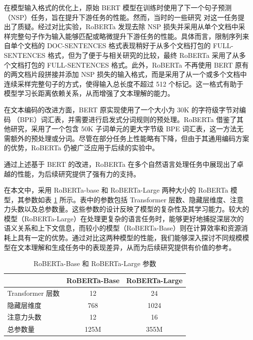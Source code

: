 在模型输入格式的优化上，原始 BERT 模型在训练时使用了下一个句子预测（NSP）任务，旨在提升下游任务的性能。然而，当时的一些研究 \cite{Lample2019CrosslingualLM, Yang2019XLNetGA, Joshi2019SpanBERTIP} 对这一任务提出了质疑。经过对比实验，RoBERTa 发现去除 NSP 损失并采用从单个文档中采样完整句子作为输入能够匹配或略微提升下游任务的性能。具体而言，限制序列来自单个文档的 DOC-SENTENCES 格式表现稍好于从多个文档打包的 FULL-SENTENCES 格式，但为了便于与相关研究的比较，最终 RoBERTa 采用了从多个文档打包的 FULL-SENTENCES 格式。此外，RoBERTa 不再使用 BERT 原有的两文档片段拼接并添加 NSP 损失的输入格式，而是采用了从一个或多个文档中连续采样完整句子的方式，使得输入总长度不超过 512 个标记。这一格式有助于模型学习长距离依赖关系，从而增强了文本理解的能力。

在文本编码的改进方面，BERT 原实现使用了一个大小为 30K 的字符级字节对编码 \cite{BPE} （BPE）词汇表，并需要进行启发式分词规则的预处理。RoBERTa 借鉴了其他研究，采用了一个包含 50K 子词单元的更大字节级 BPE 词汇表，这一方法无需额外的预处理或分词。尽管在部分任务上性能略有下降，但由于其通用编码方案的优势，RoBERTa 仍被广泛应用于后续的实验中。

通过上述基于 BERT 的改进，RoBERTa 在多个自然语言处理任务中展现出了卓越的性能，为后续研究提供了强有力的支持。

在本文中，采用 RoBERTa-base 和 RoBERTa-Large 两种大小的 RoBERTa 模型，其参数如表 \ref{tab:roberta-parameter} 所示。表中的参数包括 Transformer 层数、隐藏层维度、注意力头数以及总参数量。这些参数的设计反映了模型的复杂性及其学习能力。较大的模型（RoBERTa-Large）在处理更复杂的语言任务时，能够更好地捕捉深层次的语义关系和上下文信息，而较小的模型（RoBERTa-Base）则在计算效率和资源消耗上具有一定的优势。通过对比这两种模型的性能，我们能够深入探讨不同规模模型在文本理解和生成任务中的表现差异，从而为后续研究提供有价值的参考。

\begin{table}[htbp]
\centering
\caption{ RoBERTa-Base 和 RoBERTa-Large 参数} \label{tab:roberta-parameter}
\begin{tabular}{lcc}
\toprule
               & \multicolumn{1}{l}{\textbf{RoBERTa-Base}} & \multicolumn{1}{l}{\textbf{RoBERTa-Large}} \\ \midrule
Transformer 层数 & 12                                        & 24                                         \\
隐藏层维度          & 768                                       & 1024                                       \\
注意力头数          & 12                                        & 16                                         \\
总参数量           & 125M                                      & 355M                                      \\ \bottomrule
\end{tabular}
\end{table}

